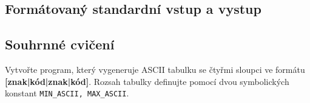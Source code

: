 {    \subsection{Formátovaný standardní vstup a vystup}
    \subsection{Souhrnné cvičení}
      \begin{example}Vytvořte program, který vygeneruje ASCII tabulku se čtyřmi sloupci ve formátu 
      \textbf{[znak|kód|znak|kód]}. Rozsah tabulky definujte pomocí dvou symbolických konstant 
      \lstinline[basicstyle=\ttfamily]!MIN_ASCII, MAX_ASCII!. 
  
        
      \end{example} 

} %
\printbibliography[title={Seznam literatury}, heading=subbibliography]
